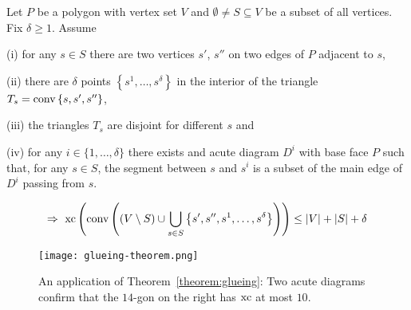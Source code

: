 \begin{theorem}\label{theorem:glueing}
  Let $P$ be a polygon with vertex set $V$ and $\emptyset \neq S \subseteq V$ be a subset of all vertices. Fix $\delta \geq 1$. Assume

  (i) for any $s \in S$ there are two vertices $s'$, $s''$ on two edges of $P$ adjacent to $s$,

  (ii) there are $\delta$ points $\left\{s^1, \dots, s^\delta \right\}$ in the interior of the triangle ${T_s = \operatorname{conv} \left\{s,s',s''\right\}}$,
  
  (iii) the triangles $T_s$ are disjoint for different $s$ and

  (iv) for any $i \in \{1,\dots,\delta\}$ there exists and acute diagram $D^i$ with base face $P$ such that, for any $s \in S$, the segment between $s$ and $s^i$ is a subset of the main edge of $D^i$ passing from $s$. 
  
  $$\Rightarrow \ \operatorname{xc}\left( \operatorname{conv}\left( (V \setminus S) \cup \bigcup_{s \in S} \left\{ s',s'',s^1,\dots,s^\delta \right\}  \right) \right) \leq \lvert V\rvert + \lvert S\rvert + \delta$$
\end{theorem}

\begin{figure}[h]
  \centering
  \texttt{[image: glueing-theorem.png]}
  \caption{An application of Theorem~\ref{theorem:glueing}: Two acute diagrams confirm that the $14$-gon on the right has $\operatorname{xc}$ at most $10$. \cite[Figure 3]{shitov2020sublinear}}
  \label{fig:glueing-theorem}
\end{figure}


